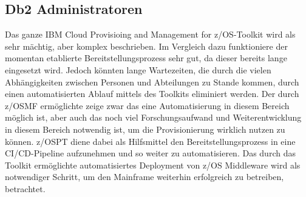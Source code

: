 \subsection{Db2 Administratoren}
Das ganze \glqq IBM Cloud Provisioing and Management for z/OS\grqq-Toolkit wird als sehr mächtig, aber komplex beschrieben.
Im Vergleich dazu funktioniere der momentan etablierte Bereitstellungsprozess sehr gut, da dieser bereits lange eingesetzt wird.
Jedoch könnten lange Wartezeiten, die durch die vielen Abhängigkeiten zwischen Personen und Abteilungen zu Stande kommen, durch einen automatisierten Ablauf mittels des Toolkits eliminiert werden.
Der durch z/OSMF ermöglichte zeige zwar das eine Automatisierung in diesem Bereich möglich ist, aber auch das noch viel Forschungsaufwand und Weiterentwicklung in diesem Bereich notwendig ist, um die Provisionierung wirklich nutzen zu können.
z/OSPT diene dabei als Hilfsmittel den Bereitstellungsprozess in eine CI/CD-Pipeline aufzunehmen und so weiter zu automatisieren.
Das durch das Toolkit ermöglichte automatisiertes Deployment von z/OS Middleware wird als notwendiger Schritt, um den Mainframe weiterhin erfolgreich zu betreiben, betrachtet.

